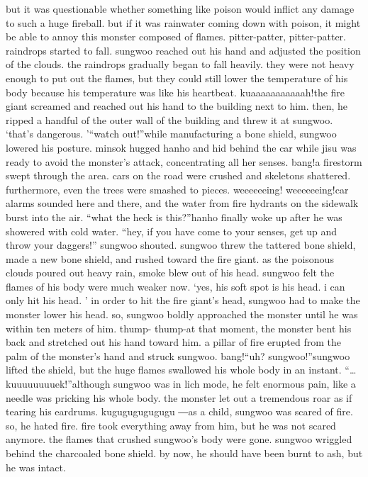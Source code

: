 but it was questionable whether something like poison would inflict any damage to such a huge fireball.
 but if it was rainwater coming down with poison, it might be able to annoy this monster composed of flames.
pitter-patter, pitter-patter.
raindrops started to fall.
 sungwoo reached out his hand and adjusted the position of the clouds.
the raindrops gradually began to fall heavily.
 they were not heavy enough to put out the flames, but they could still lower the temperature of his body because his temperature was like his heartbeat.
kuaaaaaaaaaaah!the fire giant screamed and reached out his hand to the building next to him.
 then, he ripped a handful of the outer wall of the building and threw it at sungwoo.
‘that’s dangerous.
’“watch out!”while manufacturing a bone shield, sungwoo lowered his posture.
 minsok hugged hanho and hid behind the car while jisu was ready to avoid the monster’s attack, concentrating all her senses.
bang!a firestorm swept through the area.
 cars on the road were crushed and skeletons shattered.
 furthermore, even the trees were smashed to pieces.
weeeeeeing! weeeeeeing!car alarms sounded here and there, and the water from fire hydrants on the sidewalk burst into the air.
“what the heck is this?”hanho finally woke up after he was showered with cold water.
“hey, if you have come to your senses, get up and throw your daggers!” sungwoo shouted.
sungwoo threw the tattered bone shield, made a new bone shield, and rushed toward the fire giant.
as the poisonous clouds poured out heavy rain, smoke blew out of his head.
sungwoo felt the flames of his body were much weaker now.
‘yes, his soft spot is his head.
 i can only hit his head.
’
in order to hit the fire giant’s head, sungwoo had to make the monster lower his head.
so, sungwoo boldly approached the monster until he was within ten meters of him.
thump- thump-at that moment, the monster bent his back and stretched out his hand toward him.
a pillar of fire erupted from the palm of the monster’s hand and struck sungwoo.
bang!“uh? sungwoo!”sungwoo lifted the shield, but the huge flames swallowed his whole body in an instant.
“…kuuuuuuuuek!”although sungwoo was in lich mode, he felt enormous pain, like a needle was pricking his whole body.
 the monster let out a tremendous roar as if tearing his eardrums.
kugugugugugugu ―as a child, sungwoo was scared of fire.
 so, he hated fire.
 fire took everything away from him, but he was not scared anymore.
the flames that crushed sungwoo’s body were gone.
 sungwoo wriggled behind the charcoaled bone shield.
 by now, he should have been burnt to ash, but he was intact.
